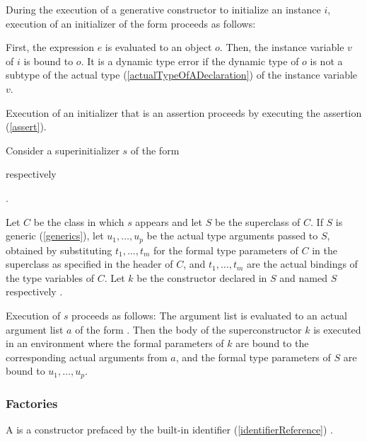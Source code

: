 \documentclass[makeidx]{article}
\begin{document}
\LMHash{}%
During the execution of a generative constructor to initialize an instance $i$,
execution of an initializer of the form 
proceeds as follows:

\LMHash{}%
First, the expression $e$ is evaluated to an object $o$.
Then, the instance variable $v$ of $i$ is bound to $o$.
It is a dynamic type error if the dynamic type of $o$ is not
a subtype of the actual type
(\ref{actualTypeOfADeclaration})
of the instance variable $v$.

\LMHash{}%
Execution of an initializer that is an assertion proceeds by executing the assertion (\ref{assert}).

\LMHash{}%
Consider a superinitializer $s$ of the form

respectively

.

\LMHash{}%
Let $C$ be the class in which $s$ appears and let $S$ be the superclass of $C$.
If $S$ is generic (\ref{generics}),
let $u_1, \ldots, u_p$ be the actual type arguments passed to $S$,
obtained by substituting $t_1, \ldots, t_m$
for the formal type parameters of $C$
in the superclass as specified in the header of $C$, and
$t_1, \ldots, t_m$
are the actual bindings of the type variables of $C$.
Let $k$ be the constructor declared in $S$ and named
$S$ respectively .

\LMHash{}%
Execution of $s$ proceeds as follows:
The argument list
is evaluated to an actual argument list $a$ of the form
.
Then the body of the superconstructor $k$ is executed
in an environment where the formal parameters of $k$ are bound to
the corresponding actual arguments from $a$,
and the formal type parameters of $S$ are bound to $u_1, \ldots, u_p$.


\subsubsection{Factories}

\LMHash{}%
A 
is a constructor prefaced by the built-in identifier
(\ref{identifierReference})
\FACTORY{}.
\end{document}
